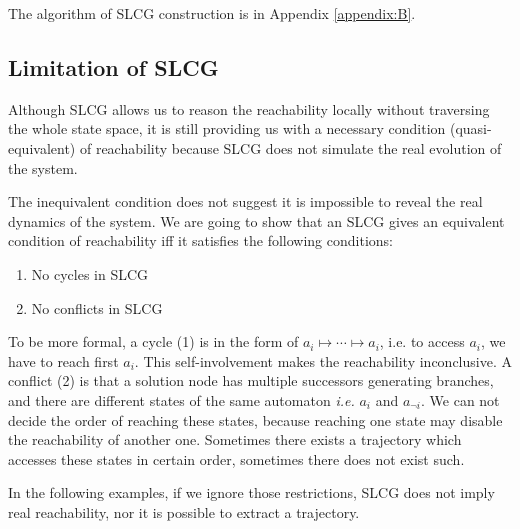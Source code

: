 \documentclass[runningheads]{llncs}
\begin{document}
The algorithm of SLCG construction is in Appendix \ref{appendix:B}.


\subsection{Limitation of SLCG}\label{limitation}
Although SLCG allows us to reason the reachability locally without traversing the whole state space, it is still providing us with a necessary condition (quasi-equivalent) of reachability because SLCG does not simulate the real evolution of the system.

The inequivalent condition does not suggest it is impossible to reveal the real dynamics of the system. We are going to show that an SLCG gives an equivalent condition of reachability iff it satisfies the following conditions:

\begin{enumerate}
\item No cycles in SLCG
\item No conflicts in SLCG

\end{enumerate}
To be more formal, a cycle (1) is in the form of $a_i\mapsto\cdots\mapsto a_i$, i.e. to access $a_i$, we have to reach first $a_i$. This self-involvement makes the reachability inconclusive. A conflict (2) is that a solution node has multiple successors generating branches, and there are different states of the same automaton \textit{i.e.} $a_i$ and $a_{\lnot i}$. We can not decide the order of reaching these states, because reaching one state may disable the reachability of another one. Sometimes there exists a trajectory which accesses these states in certain order, sometimes there does not exist such.

In the following examples, if we ignore those restrictions, SLCG does not imply real reachability, nor it is possible to extract a trajectory.
\end{document}
